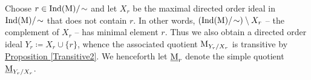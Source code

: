 \noindent Choose $r \in \textnormal{Ind}(\textnormal{M})/\!\sim$ and let $X_r$ be the maximal directed order ideal in $\textnormal{Ind}(\textnormal{M})/\!\sim$ that does not contain $r$. In other words, $(\textnormal{Ind}(\textnormal{M})/\!\sim)\setminus X_r$ -- the complement of $X_r$ -- has minimal element $r$. %
Thus we also obtain a directed order ideal $Y_r \coloneqq X_r \cup \{r\}$, whence the associated quotient $\textnormal{M}_{Y_r/X_r}$ is transitive by \hyperref[Transitive2]{Proposition \ref*{Transitive2}}. We henceforth let $\underline{\textnormal{M}}_r$ denote the simple quotient $\underline{\textnormal{M}}_{Y_r/X_r}$.\\


